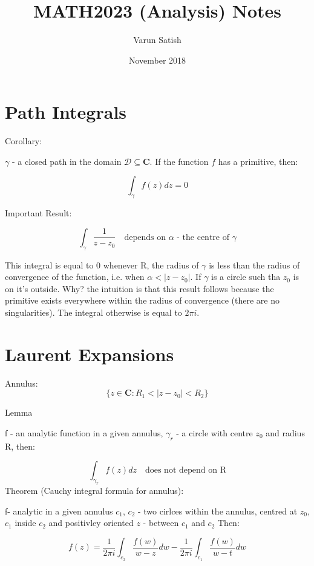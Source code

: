 \documentclass[11pt, oneside]{article}
\title{MATH2023 (Analysis) Notes}
\author{Varun Satish }
\date{November 2018}
\begin{document}
\maketitle

\section{Path Integrals}

Corollary:

$\gamma$ - a closed path in the domain $\mathcal{D} \subseteq \mathbf{C}$. If the function $f$ has a primitive, then:

\[ \int_{\gamma} f(z) dz = 0\]

Important Result:

\[\int_{\gamma} \frac{1}{z-z_0} \quad \text{depends on $\alpha$ - the centre of $\gamma$} \] 

This integral is equal to 0 whenever R, the radius of $\gamma$ is less than the radius of convergence of the function, i.e. when  $\alpha < |z - z_0| $. If $\gamma$ is a circle such tha $z_0$ is on it's outside. Why? the intuition is that this result follows because the primitive exists everywhere within the radius of convergence (there are no singularities). The integral otherwise is equal to $2 \pi i$. 

\section{Laurent Expansions}

Annulus: 
\[ \big\{ z \in \mathbf{C} : R_1 < |z - z_0| < R_2  \big\} \]

Lemma

f - an analytic function in a given annulus, $\gamma_r$ - a circle with centre $z_0$ and radius R, then:

\[ \int_{\gamma_r} f(z) dz \quad \text{does not depend on R} \]
Theorem (Cauchy integral formula for annulus):

f- analytic in a given annulus
$c_1$, $c_2$ - two cirlces within the annulus, centred at $z_0$, $c_1$ inside $c_2$ and positivley oriented
$z$ - between $c_1$ and $c_2$ 
Then:

\[ f(z) = \frac{1}{2 \pi i} \int_{c_2} \frac{f(w)}{w - z} dw - \frac{1}{2 \pi i} \int_{c_1} \frac{f(w)}{w - t} dw \]
\end{document}
